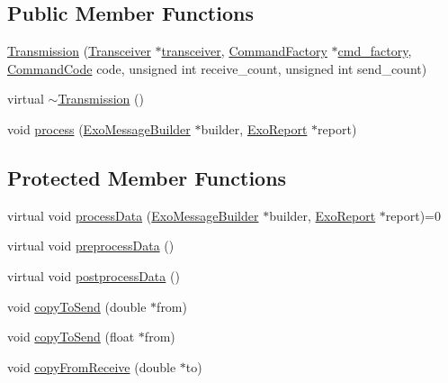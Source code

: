 \subsection*{Public Member Functions}
\begin{DoxyCompactItemize}
\item 
\hyperlink{classTransmission_ab2df2110cf9f9fc8b331ae656f0cca3a}{Transmission} (\hyperlink{classTransceiver}{Transceiver} $\ast$\hyperlink{classTransmission_a4136f9d979a928565232a2d3d6eb5ac5}{transceiver}, \hyperlink{classCommandFactory}{Command\+Factory} $\ast$\hyperlink{classTransmission_a1f0d106884524b89375804da9bcc7c11}{cmd\+\_\+factory}, \hyperlink{Command__Codes_8hpp_a59210a0ae0b431bbcaba126ab960fd62}{Command\+Code} code, unsigned int receive\+\_\+count, unsigned int send\+\_\+count)
\item 
virtual \hyperlink{classTransmission_adcdc6012d99ddb1d0c3159d50984e146}{$\sim$\+Transmission} ()
\item 
void \hyperlink{classTransmission_ab4c63999e243d2ac9879d37e7e2f4de6}{process} (\hyperlink{classExoMessageBuilder}{Exo\+Message\+Builder} $\ast$builder, \hyperlink{classExoReport}{Exo\+Report} $\ast$report)
\end{DoxyCompactItemize}
\subsection*{Protected Member Functions}
\begin{DoxyCompactItemize}
\item 
virtual void \hyperlink{classTransmission_af20b71b7ca6066a5d23a30ffc2b51b98}{process\+Data} (\hyperlink{classExoMessageBuilder}{Exo\+Message\+Builder} $\ast$builder, \hyperlink{classExoReport}{Exo\+Report} $\ast$report)=0
\item 
virtual void \hyperlink{classTransmission_a67efba97be938e7539d9c34e55681e92}{preprocess\+Data} ()
\item 
virtual void \hyperlink{classTransmission_a7bc66c569ce579c28dad60a5128998f6}{postprocess\+Data} ()
\item 
void \hyperlink{classTransmission_a71f24ce6af40e8b1cbe864a7be9c6265}{copy\+To\+Send} (double $\ast$from)
\item 
void \hyperlink{classTransmission_a0b10d5327a7f812a81dce8f80a257c36}{copy\+To\+Send} (float $\ast$from)
\item 
void \hyperlink{classTransmission_a94f5ca622dae9ceea5464e3980626a61}{copy\+From\+Receive} (double $\ast$to)
\end{DoxyCompactItemize}
